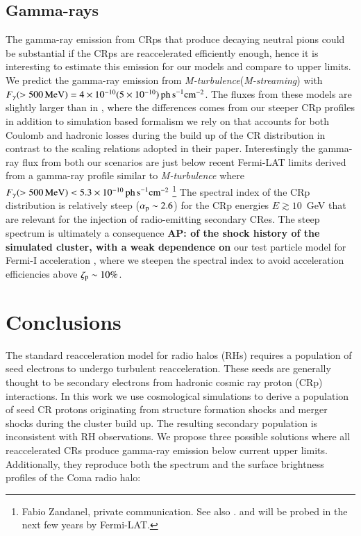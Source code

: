 \documentclass[a4paper,fleqn,usenatbib]{mnras}
\newcommand{\Mstream}{{\it M-streaming}\xspace}
\newcommand{\Mflatturb}{{\it M-turbulence}\xspace}
\def\AP#1{{\bf  AP: #1}}
\begin{document}
\subsection{Gamma-rays}
The gamma-ray emission from CRps that produce decaying neutral pions
could be substantial if the CRps are reaccelerated efficiently enough,
hence it is interesting to estimate this emission for our models and
compare to upper limits. We predict the gamma-ray emission from
\Mflatturb (\Mstream) with $F_\gamma(>500\,{\mathrm{MeV}})=4\times10^{-10}
(5\times10^{-10}) \mathrm{ \,ph\, s}^{-1}\mathrm{cm}^{-2}$. The fluxes
from these models are slightly larger than in \cite{brunetti12}, where
the differences comes from our steeper CRp profiles in addition to
simulation based formalism we rely on that accounts for both Coulomb
and hadronic losses during the build up of the CR distribution in
contrast to the scaling relations adopted in their
paper. Interestingly the gamma-ray flux from both our scenarios are
just below recent Fermi-LAT limits derived from a gamma-ray profile
similar to \Mflatturb where
$F_\gamma(>500\,{\mathrm{MeV}})<5.3\times10^{-10} \mathrm{ \,ph\,
  s}^{-1}\mathrm{cm}^{-2}$ \footnote{Fabio Zandanel, private
  communication. See also
  \citet{2014MNRAS.440..663Z,2014ApJ...787...18A}. and will be probed
  in the next few years by Fermi-LAT. } The spectral index of the CRp
distribution is relatively steep ($\alpha_{{\mathrm{p}}}\sim2.6$) for the
CRp energies $E \gtrsim 10$~GeV that are relevant for the injection of
radio-emitting secondary CRes. The steep spectrum is ultimately a
consequence \AP{of the shock history of the simulated cluster, with a
  weak dependence on} our test particle model for Fermi-I acceleration
\citep{pinzke13}, where we steepen the spectral index to avoid
acceleration efficiencies above $\zeta_{{\mathrm{p}}} \sim 10\%$.


\section{Conclusions}
\label{sec:conclusions}

The standard reacceleration model for radio halos (RHs) requires a
population of seed electrons to undergo turbulent
reacceleration. These seeds are generally thought to be secondary
electrons from hadronic cosmic ray proton (CRp) interactions. In this
work we use cosmological simulations to derive a population of seed CR
protons originating from structure formation shocks and merger shocks
during the cluster build up. The resulting secondary population is
inconsistent with RH observations. We propose three possible solutions
where all reaccelerated CRs produce gamma-ray emission below current
upper limits. Additionally, they reproduce both the spectrum and the
surface brightness profiles of the Coma radio halo:
\end{document}
